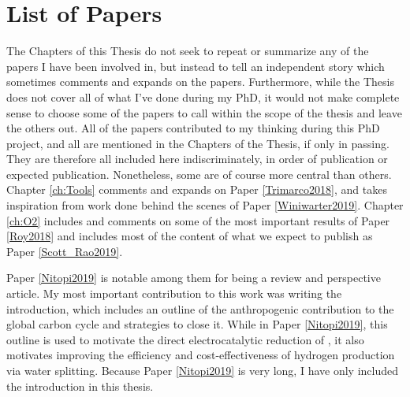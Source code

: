 \chapter*{List of Papers}

The Chapters of this Thesis do not seek to repeat or summarize any of the papers I have been involved in, but instead to tell an independent story which sometimes comments and expands on the papers. Furthermore, while the Thesis does not cover all of what I've done during my PhD, it would not make complete sense to choose some of the papers to call within the scope of the thesis and leave the others out. All of the papers contributed to my thinking during this PhD project, and all are mentioned in the Chapters of the Thesis, if only in passing. They are therefore all included here indiscriminately, in order of publication or expected publication. Nonetheless, some are of course more central than others. Chapter \ref{ch:Tools} comments and expands on Paper \ref{Trimarco2018}, and takes inspiration from work done behind the scenes of Paper \ref{Winiwarter2019}. Chapter \ref{ch:O2} includes and comments on some of the most important results of Paper \ref{Roy2018} and includes most of the content of what we expect to publish as Paper \ref{Scott_Rao2019}. 

Paper \ref{Nitopi2019} is notable among them for being a review and perspective article. My most important contribution to this work was writing the introduction, which includes an outline of the anthropogenic contribution to the global carbon cycle and strategies to close it. While in Paper \ref{Nitopi2019}, this outline is used to motivate the direct electrocatalytic reduction of , it also motivates improving the efficiency and cost-effectiveness of hydrogen production via water splitting. Because Paper \ref{Nitopi2019} is very long, I have only included the introduction in this thesis.

